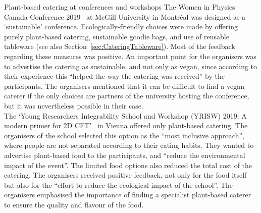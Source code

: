 \documentclass[../SustainableHEP.tex]{subfiles}
\begin{document}
\begin{bestpractice}{Plant-based catering at conferences and workshops}%
\noindent The Women in Physics Canada Conference 2019~\cite{WIPC} at McGill University in Montréal was designed as a `sustainable' conference. Ecologically-friendly choices were made by offering purely plant-based catering, sustainable goodie bags, and use of reusable tableware (see also Section~\ref{sec:CateringTableware}). Most of the feedback regarding these measures was positive. An important point for the organisers was to advertise the catering as sustainable, and not only as vegan, since according to their experience this ``helped the way the catering was received'' by the participants. The organisers mentioned that it can be difficult to find a vegan caterer if the only choices are partners of the university hosting the conference, but it was nevertheless possible in their case.\\

   The `Young Researchers Integrability School and Workshop (YRISW) 2019: A modern primer for 2D CFT'~\cite{YRISW} in Vienna offered only plant-based catering. The organisers of the school selected this option as the ``most inclusive approach'', where people are not separated according to their eating habits. They wanted to advertise plant-based food to the participants, and ``reduce the environmental impact of the event''. The limited food options also reduced the total cost of the catering. The organisers received positive feedback, not only for the food itself but also for the ``effort to reduce the ecological impact of the school''. The organisers emphasised the importance of finding a specialist plant-based caterer to ensure the quality and flavour of the food.
\end{bestpractice}
\end{document}
